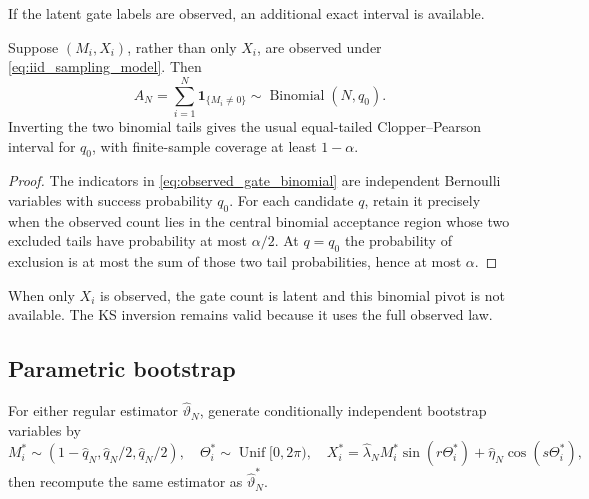 \documentclass[11pt]{amsart}
\numberwithin{equation}{section}\setcounter{tocdepth}{3}\setcounter{secnumdepth}{3}
\begin{document}
If the latent gate labels are observed, an additional exact interval is available.
\begin{proposition}\label{prop:observed_gate_interval}
Suppose $(M_i,X_i)$, rather than only $X_i$, are observed under
\eqref{eq:iid_sampling_model}.  Then
\begin{equation}
 A_N=\sum_{i=1}^N\mathbf1_{\{M_i\ne0\}}\sim\operatorname{Binomial}(N,q_0).
 \label{eq:observed_gate_binomial}
\end{equation}
Inverting the two binomial tails gives the usual equal-tailed Clopper--Pearson interval
for $q_0$, with finite-sample coverage at least $1-\alpha$.
\end{proposition}
\begin{proof}
The indicators in \eqref{eq:observed_gate_binomial} are independent Bernoulli variables
with success probability $q_0$.  For each candidate $q$, retain it precisely when the
observed count lies in the central binomial acceptance region whose two excluded tails
have probability at most $\alpha/2$.  At $q=q_0$ the probability of exclusion is at most
the sum of those two tail probabilities, hence at most $\alpha$.
\end{proof}
When only $X_i$ is observed, the gate count is latent and this binomial pivot is not
available.  The KS inversion remains valid because it uses the full observed law.

\subsection{Parametric bootstrap}\label{subsec:parametric_bootstrap}
For either regular estimator $\widehat\vartheta_N$, generate conditionally independent
bootstrap variables by
\begin{equation}
 M_i^*\sim(1-\widehat q_N,\widehat q_N/2,\widehat q_N/2),
 \quad \Theta_i^*\sim\operatorname{Unif}[0,2\pi),
 \quad
 X_i^*=\widehat\lambda_NM_i^*\sin(r\Theta_i^*)
       +\widehat\eta_N\cos(s\Theta_i^*),
 \label{eq:parametric_bootstrap_sample}
\end{equation}
then recompute the same estimator as $\widehat\vartheta_N^*$.
\end{document}
